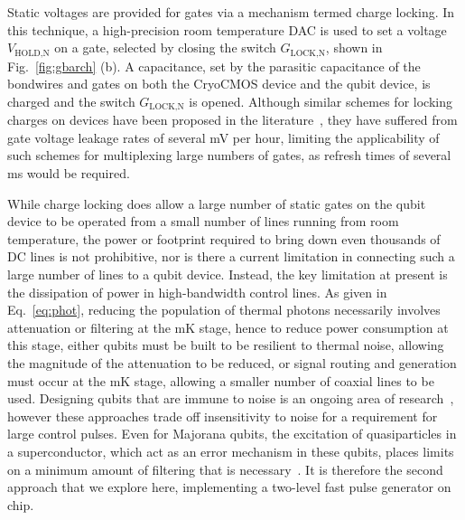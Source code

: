 Static voltages are provided for gates via a mechanism termed charge locking. In this technique, a high-precision room temperature DAC is used to set a voltage $V_\textrm{HOLD,N}$ on a
gate, selected by closing the switch $G_\textrm{LOCK,N}$, shown in Fig.~\ref{fig:gbarch} (b). A capacitance, set by the parasitic capacitance of the bondwires and gates on both the
CryoCMOS device and the qubit device, is charged and the switch $G_\textrm{LOCK,N}$ is opened. Although similar schemes for locking charges on devices have been proposed in the
literature~\cite{PhysRevApplied.9.054016,doi:10.1063/1.4932012}, they have suffered from gate voltage leakage rates of several mV per hour, limiting the applicability
of such schemes for multiplexing large numbers of gates, as refresh times of several ms would be required.

While charge locking does allow a large number of static gates on the qubit device to be operated from a small number of lines running from room temperature, the power or footprint
required to bring down even thousands of DC lines is not prohibitive, nor is there a current limitation in connecting such a large number of lines to a qubit device. Instead,
the key limitation at present is the dissipation of power in high-bandwidth control lines. As given in Eq.~\ref{eq:phot}, reducing the population of thermal photons
necessarily involves attenuation or filtering at the mK stage, hence to reduce power consumption at this stage, either qubits must be built to be resilient to thermal noise, allowing
the magnitude of the attenuation to be reduced, or signal routing and generation must occur at the mK stage, allowing a smaller number of coaxial lines to be used. Designing qubits
that are immune to noise is an ongoing area of research~\cite{PhysRevB.93.121410,PhysRevLett.121.177701,PhysRevB.97.155402}, however these approaches trade off insensitivity to noise
for a requirement for large control pulses. Even for Majorana qubits, the excitation of quasiparticles in a superconductor, which act as an error mechanism in these qubits,
places limits on a minimum amount of filtering that is necessary~\cite{PhysRevLett.106.167004}. It is therefore the second approach that we explore here, implementing a two-level
fast pulse generator on chip.

